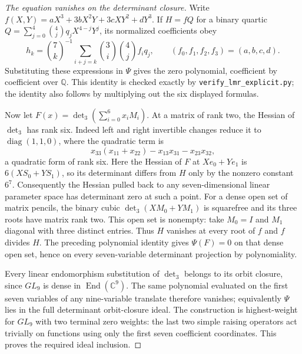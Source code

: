 \begin{proof}[The equation vanishes on the determinant closure]
Write $f(X,Y)=aX^3+3bX^2Y+3cXY^2+dY^3$.
If $H=fQ$ for a binary quartic
$Q=\sum_{j=0}^4\binom4j q_jX^{4-j}Y^j$, its normalized coefficients obey
\[
 h_k=\binom7k^{-1}\sum_{i+j=k}\binom3i\binom4j f_iq_j,
 \qquad(f_0,f_1,f_2,f_3)=(a,b,c,d).
\]
Substituting these expressions in $\Psi$ gives the zero polynomial,
coefficient by coefficient over $\mathbb Q$. This identity is checked
exactly by \texttt{verify\_lmr\_explicit.py}; the identity also follows by
multiplying out the six displayed formulas.

Now let $F(x)=\det_3(\sum_{i=0}^6x_iM_i)$. At a matrix of rank two,
the Hessian of $\det_3$ has rank six. Indeed left and right invertible
changes reduce it to $\operatorname{diag}(1,1,0)$, where the quadratic
term is
\[
              x_{33}(x_{11}+x_{22})-x_{13}x_{31}-x_{23}x_{32},
\]
a quadratic form of rank six. Here the Hessian of $F$ at $Xe_0+Ye_1$ is $6(XS_0+YS_1)$,
so its determinant differs from $H$ only by the nonzero constant $6^7$.
Consequently the Hessian pulled back to
any seven-dimensional linear parameter space has determinant zero at
such a point. For a dense open set of matrix pencils, the binary cubic
$\det_3(XM_0+YM_1)$ is squarefree and its three roots have matrix rank
two. This open set is nonempty: take $M_0=I$ and $M_1$ diagonal with three
distinct entries. Thus $H$ vanishes at every root of $f$ and $f$ divides
$H$. The preceding polynomial identity gives $\Psi(F)=0$ on that dense
open set, hence on every seven-variable determinant projection by
polynomiality.

Every linear endomorphism substitution of $\det_3$ belongs to its orbit
closure, since $GL_9$ is dense in $\operatorname{End}(\mathbb C^9)$.
The same polynomial evaluated on the first seven variables of any
nine-variable translate therefore vanishes; equivalently $\Psi$ lies
in the full determinant orbit-closure ideal. The construction is
highest-weight for $GL_9$ with two terminal zero weights: the last two
simple raising operators act trivially on functions using only the
first seven coefficient coordinates. This proves the required ideal
inclusion.
\end{proof}


